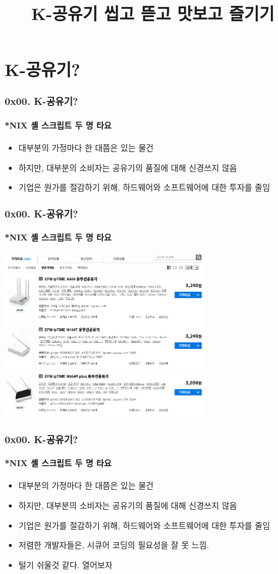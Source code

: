 \documentclass {beamer}
\title {K-공유기 씹고 뜯고 맛보고 즐기기}
\begin{document}
\begin{frame}
  \titlepage
\end{frame}


\section[Section]{K-공유기?}
\begin{frame}
  \frametitle{0x00. K-공유기?}
  \framesubtitle{*NIX 셸 스크립트 두 명 타요}

  \begin{itemize}
  \item 대부분의 가정마다 한 대쯤은 있는 물건
  \item<2-> 하지만, 대부분의 소비자는 공유기의 품질에 대해 신경쓰지 않음
  \item<3-> 기업은 원가를 절감하기 위해, 하드웨어와 소프트웨어에 대한 투자를 줄임
  \end{itemize}
\end{frame}

\begin{frame}
  \frametitle{0x00. K-공유기?}
  \framesubtitle{*NIX 셸 스크립트 두 명 타요}

  \includegraphics [width=90mm]{img/cheapwrt.png}
\end{frame}

\begin{frame}
  \frametitle{0x00. K-공유기?}
  \framesubtitle{*NIX 셸 스크립트 두 명 타요}

  \begin{itemize}
  \item 대부분의 가정마다 한 대쯤은 있는 물건
  \item 하지만, 대부분의 소비자는 공유기의 품질에 대해 신경쓰지 않음
  \item 기업은 원가를 절감하기 위해, 하드웨어와 소프트웨어에 대한 투자를 줄임
  \item 저렴한 개발자들은, 시큐어 코딩의 필요성을 잘 못 느낌.
  \item<2-> 털기 쉬울것 같다. 열어보자
  \end{itemize}
\end{frame}
\end{document}

